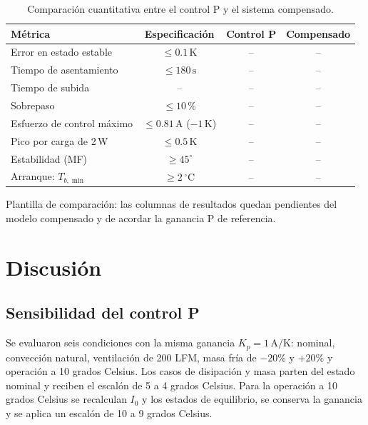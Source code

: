\documentclass[journal,twocolumn]{IEEEtran}
\begin{document}
\begin{table}[!tbp]\centering
\caption{Comparación cuantitativa entre el control P y el sistema compensado.}\label{tab:comparacion}
{\footnotesize\setlength{\tabcolsep}{3pt}\renewcommand{\arraystretch}{1.15}
\begin{tabular}{@{}lccc@{}}\toprule
Métrica & Especificación & Control P & Compensado\\\midrule
Error en estado estable & $\le0.1\,\mathrm K$ & -- & --\\
Tiempo de asentamiento & $\le180\,\mathrm s$ & -- & --\\
Tiempo de subida & -- & -- & --\\
Sobrepaso & $\le10\,\%$ & -- & --\\
Esfuerzo de control máximo & $\le0.81\,\mathrm A$ ($-1\,\mathrm K$) & -- & --\\
Pico por carga de 2\,W & $\le0.5\,\mathrm K$ & -- & --\\
Estabilidad (MF) & $\ge45^\circ$ & -- & --\\
Arranque: $T_{b,\min}$ & $\ge2\,^\circ\mathrm C$ & -- & --\\\bottomrule
\end{tabular}}
\par\smallskip\footnotesize Plantilla de comparación: las columnas de resultados quedan pendientes del modelo compensado y de acordar la ganancia P de referencia.
\end{table}



\section{Discusión}\label{sec:discusion}
\subsection{Sensibilidad del control P}\label{sec:sensibilidad}
Se evaluaron seis condiciones con la misma ganancia $K_p=1\,\mathrm{A/K}$: nominal, convección natural, ventilación de 200 LFM, masa fría de $-20\%$ y $+20\%$ y operación a 10 grados Celsius. Los casos de disipación y masa parten del estado nominal y reciben el escalón de 5 a 4 grados Celsius. Para la operación a 10 grados Celsius se recalculan $I_0$ y los estados de equilibrio, se conserva la ganancia y se aplica un escalón de 10 a 9 grados Celsius.
\end{document}
